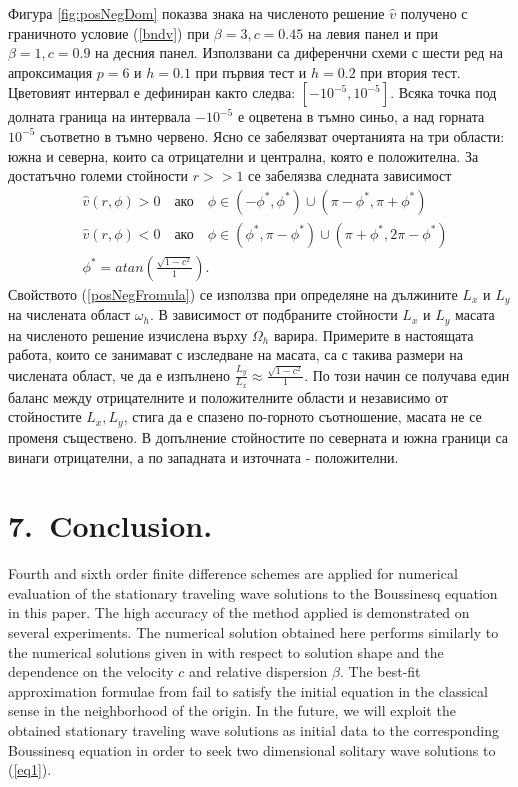 \documentclass{article}
\newcommand{\rf}[1]{(\ref{#1})}
\theoremstyle{remark}
\begin{document}
\FloatBarrier
Фигура \ref{fig:posNegDom} показва знака на численото решение $\widehat v$ получено с граничното условие \rf{bndv} при $\beta=3, c=0.45$ на левия панел и при $\beta=1, c=0.9$ на десния панел. Използвани са диференчни схеми с шести ред на апроксимация $p=6$ и $h=0.1$ при първия тест и $h=0.2$ при втория тест. Цветовият интервал е дефиниран както следва: $[-10^{-5}, 10^{-5}]$. Всяка точка под долната граница на интервала $-10^{-5}$ е оцветена в тъмно синьо, а над горната $10^{-5}$ съответно в тъмно червено. Ясно се забелязват очертанията на три области: южна и северна, които са отрицателни и централна, която е положителна. За достатъчно големи стойности $r >> 1$ се забелязва следната зависимост
\begin{align}\label{posNegFromula}
&\widehat v(r, \phi) > 0 \quad \text{ако} \quad \phi \in (-\phi^*, \phi^*) \cup (\pi - \phi^*, \pi + \phi^*)  \nonumber\\
&\widehat v(r, \phi) < 0 \quad \text{ако} \quad \phi \in (\phi^*, \pi - \phi^*) \cup (\pi + \phi^*, 2\pi-\phi^*) \nonumber\\
&\phi^* = atan(\frac{ \sqrt{1-c^2} }{ 1}).
\end{align}
Свойството \rf{posNegFromula} се използва при определяне на дължините $L_x$ и $L_y$ на числената област $\omega_h$. В зависимост от подбраните стойности $L_x$ и $L_y$ масата на численото решение изчислена върху $\Omega_h$ варира. Примерите в настоящата работа, които се занимават с изследване на масата, са с такива размери на числената област, че да е изпълнено $\frac{L_y}{L_x} \approx \frac{ \sqrt{1-c^2} }{ 1}$. По този начин се получава един баланс между отрицателните и положителните области и независимо от стойностите $L_x, L_y$, стига да е спазено по-горното съотношение, масата не се променя съществено. В допълнение стойностите по северната и южна граници са винаги отрицателни, а по западната и източната -  положителни.
\section{7.~Conclusion.}
Fourth and sixth order finite difference schemes are applied for numerical evaluation of the stationary traveling wave solutions to the Boussinesq equation in this paper. The high accuracy of the method applied is demonstrated on several experiments. The numerical solution obtained here performs similarly to the numerical solutions given in \cite{Ch2012,Ch2011} with respect to solution shape and the dependence on the velocity $c$ and relative dispersion $\beta$. 
The best-fit approximation formulae from \cite{Ch2011} fail to satisfy the initial equation in the classical sense in the neighborhood of the origin. 
In the future, we will exploit the obtained stationary traveling wave solutions as initial data to the corresponding Boussinesq equation in order to seek two dimensional solitary wave solutions to \rf{eq1}.
\end{document}
